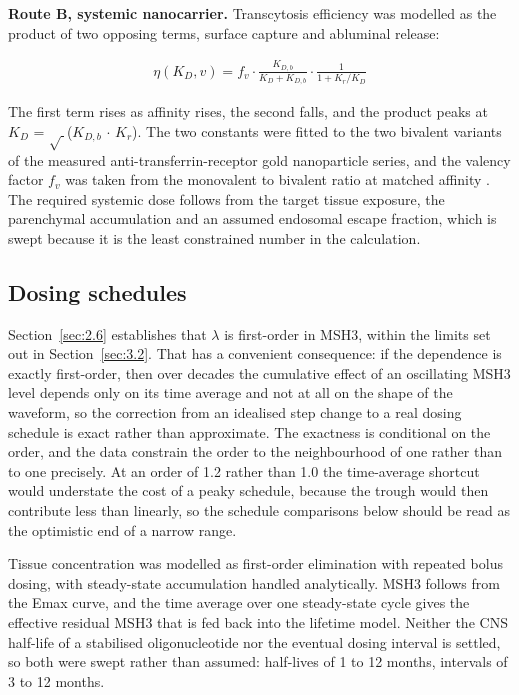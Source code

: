 \documentclass[conference]{IEEEtran}
\begin{document}
\textbf{Route B, systemic nanocarrier.} Transcytosis efficiency was modelled as the product of two opposing terms, surface capture and abluminal release:

\begin{equation}
\begin{split}
\eta(K_D, v) = f_v \cdot \frac{K_{D,b}}{K_D + K_{D,b}} \cdot \frac{1}{1 + K_r/K_D}
\end{split}
\end{equation}

The first term rises as affinity rises, the second falls, and the product peaks at $K_{D}$ = $\sqrt{\ }$($K_{D,b}$ $\cdot$ $K_{r}$). The two constants were fitted to the two bivalent variants of the measured anti-transferrin-receptor gold nanoparticle series, and the valency factor $f_{v}$ was taken from the monovalent to bivalent ratio at matched affinity \cite{johnsen}. The required systemic dose follows from the target tissue exposure, the parenchymal accumulation and an assumed endosomal escape fraction, which is swept because it is the least constrained number in the calculation.

\subsection{Dosing schedules}
\label{sec:2.10}
Section~\ref{sec:2.6} establishes that $\lambda$ is first-order in MSH3, within the limits set out in Section~\ref{sec:3.2}. That has a convenient consequence: if the dependence is exactly first-order, then over decades the cumulative effect of an oscillating MSH3 level depends only on its time average and not at all on the shape of the waveform, so the correction from an idealised step change to a real dosing schedule is exact rather than approximate. The exactness is conditional on the order, and the data constrain the order to the neighbourhood of one rather than to one precisely. At an order of 1.2 rather than 1.0 the time-average shortcut would understate the cost of a peaky schedule, because the trough would then contribute less than linearly, so the schedule comparisons below should be read as the optimistic end of a narrow range.

Tissue concentration was modelled as first-order elimination with repeated bolus dosing, with steady-state accumulation handled analytically. MSH3 follows from the Emax curve, and the time average over one steady-state cycle gives the effective residual MSH3 that is fed back into the lifetime model. Neither the CNS half-life of a stabilised oligonucleotide nor the eventual dosing interval is settled, so both were swept rather than assumed: half-lives of 1 to 12 months, intervals of 3 to 12 months.
\end{document}
